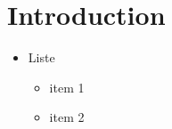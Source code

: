\documentclass[11pt]{article}
\begin{document}
\clearpage
\section{Introduction}

\begin{itemize}[leftmargin=0cm,label={}]
\item Liste
\begin{itemize}
\item item 1
\item item 2
\end{itemize}
\end{itemize}
\end{document}
